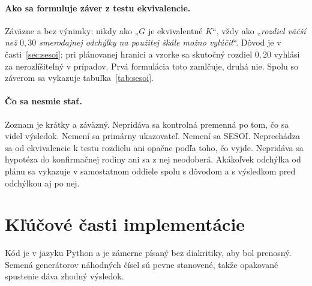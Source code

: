 \paragraph{Ako sa formuluje záver z testu ekvivalencie.} Záväzne a bez výnimky: nikdy ako „$G$ je ekvivalentné $K$“, vždy ako „\emph{rozdiel väčší než $0{,}30$ smerodajnej odchýlky na použitej škále možno vylúčiť}“. Dôvod je v časti~\ref{sec:sesoi}: pri plánovanej hranici a vzorke sa skutočný rozdiel $0{,}20$ vyhlási za nerozlíšiteľný v \eqTTwentyBThirty{} prípadov. Prvá formulácia toto zamlčuje, druhá nie. Spolu so záverom sa vykazuje tabuľka~\ref{tab:sesoi}.

\paragraph{Čo sa nesmie stať.} Zoznam je krátky a záväzný. Nepridáva sa kontrolná premenná po tom, čo sa videl výsledok. Nemení sa primárny ukazovateľ. Nemení sa SESOI. Neprechádza sa od ekvivalencie k testu rozdielu ani opačne podľa toho, čo vyjde. Nepridáva sa hypotéza do konfirmačnej rodiny ani sa z nej neodoberá. Akákoľvek odchýlka od plánu sa vykazuje v samostatnom oddiele spolu s dôvodom a s výsledkom pred odchýlkou aj po nej.

\section{Kľúčové časti implementácie}
\label{sec:kod}

Kód je v jazyku Python a je zámerne písaný bez diakritiky, aby bol prenosný. Semená generátorov náhodných čísel sú pevne stanovené, takže opakované spustenie dáva zhodný výsledok.

